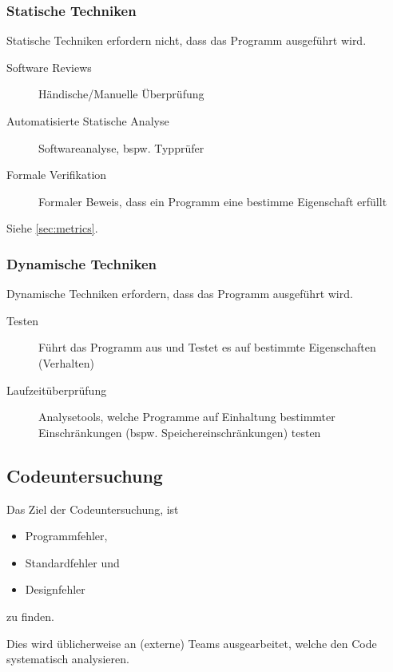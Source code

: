 \documentclass[a4paper, 11pt, accentcolor = tud3b]{tudreport}
\begin{document}
				\subsubsection{Statische Techniken}
					Statische Techniken erfordern nicht, dass das Programm ausgeführt wird.
					
					\begin{description}
						\item[Software Reviews] Händische/Manuelle Überprüfung
						\item[Automatisierte Statische Analyse] Softwareanalyse, bspw. Typprüfer
						\item[Formale Verifikation] Formaler Beweis, dass ein Programm eine bestimme Eigenschaft erfüllt
					\end{description}
					
					Siehe \ref{sec:metrics}.
				
				\subsubsection{Dynamische Techniken}
					Dynamische Techniken erfordern, dass das Programm ausgeführt wird.
					
					\begin{description}
						\item[Testen] Führt das Programm aus und Testet es auf bestimmte Eigenschaften (Verhalten)
						\item[Laufzeitüberprüfung] Analysetools, welche Programme auf Einhaltung bestimmter Einschränkungen (bspw. Speichereinschränkungen) testen
					\end{description}

			\subsection{Codeuntersuchung}
				Das Ziel der Codeuntersuchung, ist
				\begin{itemize}
					\item Programmfehler,
					\item Standardfehler und
					\item Designfehler
				\end{itemize}
				zu finden.
				
				Dies wird üblicherweise an (externe) Teams ausgearbeitet, welche den Code systematisch analysieren.
				
\end{document}
